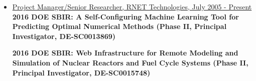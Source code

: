  \begin{itemize}
 	\setlength{\itemsep}{0.2pt}
 	
 	\item\underline{Project Manager/Senior Researcher, RNET Technologies, July 2005 - Present}\\
 	
	
 	\textbf{2016 DOE SBIR: A Self-Configuring Machine Learning
 	Tool for Predicting Optimal Numerical Methods (Phase II,
 	Principal Investigator, DE-SC0013869)}

 	\textbf{2016 DOE SBIR: Web Infrastructure for Remote Modeling
 	and Simulation of Nuclear Reactors and Fuel Cycle Systems
 	(Phase II, Principal Investigator, DE-SC0015748)}

 	

\end{itemize}
